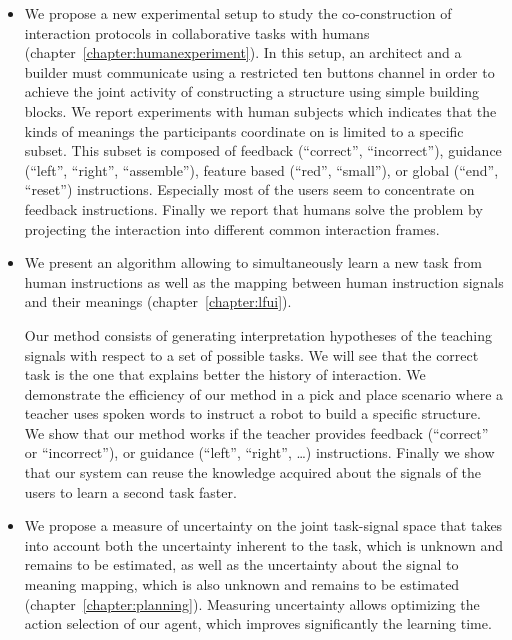 \begin{itemize}

\item We propose a new experimental setup to study the co-construction of interaction protocols in collaborative tasks with humans \cite{vollmer2014studying} (chapter~\ref{chapter:humanexperiment}). In this setup, an architect and a builder must communicate using a restricted ten buttons channel in order to achieve the joint activity of constructing a structure using simple building blocks. We report experiments with human subjects which indicates that the kinds of meanings the participants coordinate on is limited to a specific subset. This subset is composed of feedback (``correct'', ``incorrect''), guidance (``left'', ``right'', ``assemble''), feature based (``red'', ``small''), or global (``end'', ``reset'') instructions. Especially most of the users seem to concentrate on feedback instructions. Finally we report that humans solve the problem by projecting the interaction into different common interaction frames.

\item  We present an algorithm allowing to simultaneously learn a new task from human instructions as well as the mapping between human instruction signals and their meanings \cite{grizou2013interactive,grizou2013robot,grizou2014robot,grizou2014calibration,grizou2014interactive} (chapter~\ref{chapter:lfui}). 

Our method consists of generating interpretation hypotheses of the teaching signals with respect to a set of possible tasks. We will see that the correct task is the one that explains better the history of interaction. We demonstrate the efficiency of our method in a pick and place scenario where a teacher uses spoken words to instruct a robot to build a specific structure. We show that our method works if the teacher provides feedback (``correct'' or ``incorrect''), or guidance (``left'', ``right'', \ldots) instructions. Finally we show that our system can reuse the knowledge acquired about the signals of the users to learn a second task faster.

\item We propose a measure of uncertainty on the joint task-signal space that takes into account both the uncertainty inherent to the task, which is unknown and remains to be estimated, as well as the uncertainty about the signal to meaning mapping, which is also unknown and remains to be estimated \cite{grizou2014calibration,grizou2014interactive} (chapter~\ref{chapter:planning}). Measuring uncertainty allows optimizing the action selection of our agent, which improves significantly the learning time.


\end{itemize}
